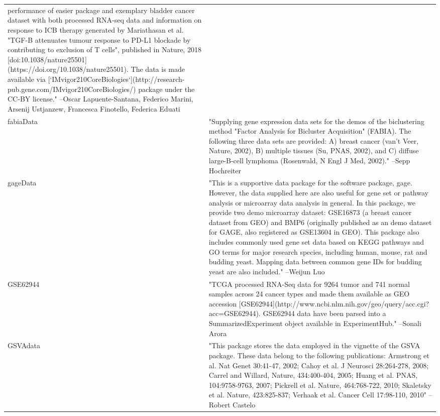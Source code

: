 \begin{longtable}[t]{l>{\raggedright\arraybackslash}p{25em}}
performance of easier package and exemplary bladder cancer
dataset with both processed RNA-seq data and information on
response to ICB therapy generated by Mariathasan et al. "TGF-B
attenuates tumour response to PD-L1 blockade by contributing to
exclusion of T cells", published in Nature, 2018
[doi:10.1038/nature25501](https://doi.org/10.1038/nature25501).
The data is made available via
[`IMvigor210CoreBiologies`](http://research-pub.gene.com/IMvigor210CoreBiologies/)
package under the CC-BY license." --Oscar Lapuente-Santana, Federico Marini, Arsenij Ustjanzew, Francesca Finotello, Federica Eduati\\
fabiaData & "Supplying gene expression data sets for the demos of the
biclustering method "Factor Analysis for Bicluster Acquisition"
(FABIA). The following three data sets are provided: A) breast
cancer (van't Veer, Nature, 2002), B) multiple tissues (Su,
PNAS, 2002), and C) diffuse large-B-cell lymphoma (Rosenwald, N
Engl J Med, 2002)." --Sepp Hochreiter\\
gageData & "This is a supportive data package for the software
package, gage. However, the data supplied here are also useful
for gene set or pathway analysis or microarray data analysis in
general. In this package, we provide two demo microarray
dataset: GSE16873 (a breast cancer dataset from GEO) and BMP6
(originally published as an demo dataset for GAGE, also
registered as GSE13604 in GEO). This package also includes
commonly used gene set data based on KEGG pathways and GO terms
for major research species, including human, mouse, rat and
budding yeast. Mapping data between common gene IDs for budding
yeast are also included." --Weijun Luo\\
GSE62944 & "TCGA processed RNA-Seq data for 9264 tumor and 741 normal
samples across 24 cancer types and made them available as GEO
accession
[GSE62944](http://www.ncbi.nlm.nih.gov/geo/query/acc.cgi?acc=GSE62944).
GSE62944 data have been parsed into a SummarizedExperiment
object available in ExperimentHub." --Sonali Arora\\
GSVAdata & "This package stores the data employed in the vignette of
the GSVA package. These data belong to the following
publications: Armstrong et al. Nat Genet 30:41-47, 2002; Cahoy
et al. J Neurosci 28:264-278, 2008; Carrel and Willard, Nature,
434:400-404, 2005; Huang et al. PNAS, 104:9758-9763, 2007;
Pickrell et al. Nature, 464:768-722, 2010; Skaletsky et al.
Nature, 423:825-837; Verhaak et al. Cancer Cell 17:98-110, 2010" --Robert Castelo\\

\end{longtable}

